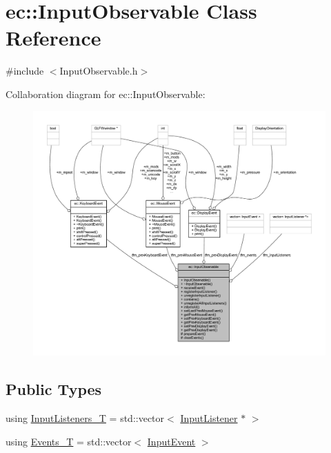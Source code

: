 \hypertarget{classec_1_1_input_observable}{}\section{ec\+:\+:Input\+Observable Class Reference}
\label{classec_1_1_input_observable}


{\ttfamily \#include $<$Input\+Observable.\+h$>$}



Collaboration diagram for ec\+:\+:Input\+Observable\+:\nopagebreak
\begin{figure}[H]
\begin{center}
\leavevmode
\includegraphics[width=350pt]{classec_1_1_input_observable__coll__graph}
\end{center}
\end{figure}
\subsection*{Public Types}
\begin{DoxyCompactItemize}
\item 
using \mbox{\hyperlink{classec_1_1_input_observable_a99717b2918621597db89d9ede34ddded}{Input\+Listeners\+\_\+T}} = std\+::vector$<$ \mbox{\hyperlink{classec_1_1_input_listener}{Input\+Listener}} $\ast$ $>$
\item 
using \mbox{\hyperlink{classec_1_1_input_observable_a9b63c8acbcbfc0f99d2964493ac52925}{Events\+\_\+T}} = std\+::vector$<$ \mbox{\hyperlink{structec_1_1_input_event}{Input\+Event}} $>$
\end{DoxyCompactItemize}

